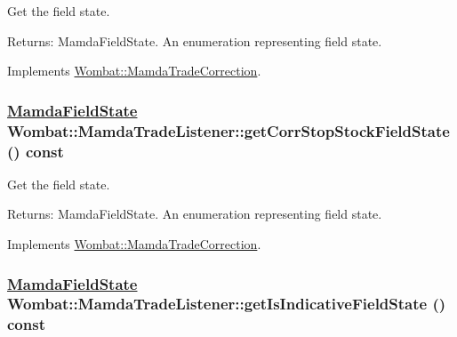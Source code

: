 Get the field state. 

\begin{Desc}
\item[Returns:]Mamda\-Field\-State. An enumeration representing field state. \end{Desc}


Implements \hyperlink{classWombat_1_1MamdaTradeCorrection_2a2041c29588e9bec281fba8b942e031}{Wombat::Mamda\-Trade\-Correction}.\hypertarget{classWombat_1_1MamdaTradeListener_92765656c70234295c688b60b2e1b50a}{
\subsubsection[getCorrStopStockFieldState]{\setlength{\rightskip}{0pt plus 5cm}\hyperlink{namespaceWombat_93aac974f2ab713554fd12a1fa3b7d2a}{Mamda\-Field\-State} Wombat::Mamda\-Trade\-Listener::get\-Corr\-Stop\-Stock\-Field\-State () const}}
\label{classWombat_1_1MamdaTradeListener_92765656c70234295c688b60b2e1b50a}


Get the field state. 

\begin{Desc}
\item[Returns:]Mamda\-Field\-State. An enumeration representing field state. \end{Desc}


Implements \hyperlink{classWombat_1_1MamdaTradeCorrection_90f75c0681775f5b3d473a3154d91676}{Wombat::Mamda\-Trade\-Correction}.\hypertarget{classWombat_1_1MamdaTradeListener_2c1db7b289b2f53ff1c2aac5fe55957b}{
\subsubsection[getIsIndicativeFieldState]{\setlength{\rightskip}{0pt plus 5cm}\hyperlink{namespaceWombat_93aac974f2ab713554fd12a1fa3b7d2a}{Mamda\-Field\-State} Wombat::Mamda\-Trade\-Listener::get\-Is\-Indicative\-Field\-State () const}}
\label{classWombat_1_1MamdaTradeListener_2c1db7b289b2f53ff1c2aac5fe55957b}


